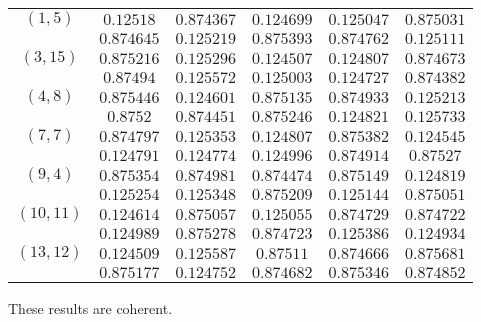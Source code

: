 \begin{enumerate}[label=\textbf{\arabic*})]
    \begin{tabular}{|c|ccccc|}
        \hline
        $(1, 5)$ & $0.12518$ & $0.874367$ & $0.124699$ & $0.125047$ & $0.875031$\\
            & $0.874645$ & $0.125219$ & $0.875393$ & $0.874762$ & $0.125111$\\
        \hline
        $(3, 15)$ & $0.875216$ & $0.125296$ & $0.124507$ & $0.124807$ & $0.874673$\\
            & $0.87494$ & $0.125572$ & $0.125003$ & $0.124727$ & $0.874382$\\
        \hline
        $(4, 8)$ & $0.875446$ & $0.124601$ & $0.875135$ & $0.874933$ & $0.125213$\\
            & $0.8752$ & $0.874451$ & $0.875246$ & $0.124821$ & $0.125733$\\
            \hline
        $(7, 7)$ & $0.874797$ & $0.125353$ & $0.124807$ & $0.875382$ & $0.124545$\\
            & $0.124791$ & $0.124774$ & $0.124996$ & $0.874914$ & $0.87527$\\
            \hline
        $(9, 4)$ & $0.875354$ & $0.874981$ & $0.874474$ & $0.875149$ & $0.124819$\\
            & $0.125254$ & $0.125348$ & $0.875209$ & $0.125144$ & $0.875051$\\
            \hline
        $(10, 11)$ & $0.124614$ & $0.875057$ & $0.125055$ & $0.874729$ & $0.874722$\\
            & $0.124989$ & $0.875278$ & $0.874723$ & $0.125386$ & $0.124934$\\
            \hline
        $(13, 12)$ & $0.124509$ & $0.125587$ & $0.87511$ & $0.874666$ & $0.875681$\\
            & $0.875177$ & $0.124752$ & $0.874682$ & $0.875346$ & $0.874852$\\
        \hline
    \end{tabular}

    These results are coherent.
\end{enumerate}


